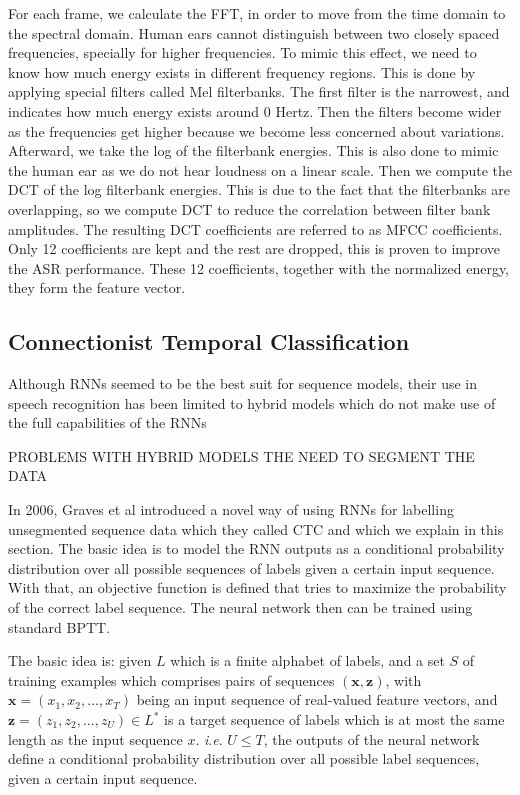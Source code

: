For each frame, we calculate the \ac{FFT}, in order to move from the time domain to the spectral domain. Human ears cannot distinguish between two closely spaced frequencies, specially for higher frequencies. To mimic this effect, we need to know how much energy exists in different frequency regions. This is done by applying special filters called Mel filterbanks. The first filter is the narrowest, and indicates how much energy exists around 0 Hertz. Then the filters become wider as the frequencies get higher because we become less concerned about variations. 
Afterward, we take the log of the filterbank energies. This is also done to mimic the human ear as we do not hear loudness on a linear scale. 
Then we compute the \ac{DCT} of the log filterbank energies. This is due to the fact that the filterbanks are overlapping, so we compute \ac{DCT} to reduce the correlation between filter bank amplitudes. The resulting \ac{DCT} coefficients are referred to as MFCC coefficients. Only 12 coefficients are kept and the rest are dropped, this is proven to improve the \ac{ASR} performance. These 12 coefficients, together with the normalized energy, they form the feature vector.



\subsection{Connectionist Temporal Classification \cite{graves2006connectionist}} 
\label{bg:sub7}

Although \ac{RNN}s seemed to be the best suit for sequence models, their use in speech recognition has been limited to hybrid models which do not make use of the full capabilities of the \ac{RNN}s


PROBLEMS WITH HYBRID MODELS
THE NEED TO SEGMENT THE DATA


In 2006, Graves et al introduced a novel way of using \ac{RNN}s for labelling unsegmented sequence data which they called \ac{CTC} and which we explain in this section. 
The basic idea is to model the \ac{RNN} outputs as a conditional probability distribution over all possible sequences of labels given a certain input sequence. With that, an objective function is defined that tries to maximize the probability of the correct label sequence. The neural network then can be trained using standard \ac{BPTT}.

The basic idea is: given $L$ which is a finite alphabet of labels, and a set $S$ of training examples which comprises pairs of sequences $(\mathbf{x},\mathbf{z})$, with $\mathbf{x} = (x_1, x_2,..., x_T)$ being an input sequence of real-valued feature vectors, and $\mathbf{z} = (z_1, z_2,..., z_U) \in L^*$ is a target sequence of labels which is at most the same length as the input sequence $x$. \textit{i}.\textit{e}. $U \leq T$, the outputs of the neural network define a conditional probability distribution over all possible label sequences, given a certain input sequence. 


